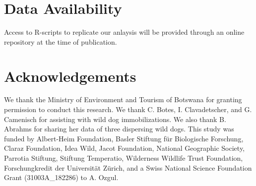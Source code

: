 \documentclass[abstract=on,10pt,a4paper,bibliography=totocnumbered]{article}
\begin{document}
\section{Data Availability}
Access to R-scripts to replicate our anlaysis will be provided through an online
repository at the time of publication.

\section{Acknowledgements}
We thank the Ministry of Environment and Tourism of Botswana for granting
permission to conduct this research. We thank C. Botes, I. Clavadetscher, and G.
Camenisch for assisting with wild dog immobilizations. We also thank B. Abrahms
for sharing her data of three dispersing wild dogs. This study was funded by
Albert-Heim Foundation, Basler Stiftung für Biologische Forschung, Claraz
Foundation, Idea Wild, Jacot Foundation, National Geographic Society, Parrotia
Stiftung, Stiftung Temperatio, Wilderness Wildlife Trust Foundation,
Forschungkredit der Universität Zürich, and a Swiss National Science Foundation
Grant (31003A\_182286) to A. Ozgul.

\newpage
\begingroup
\singlespacing

\endgroup
\end{document}
